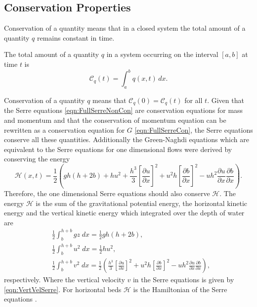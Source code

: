 \subsection{Conservation Properties}
Conservation of a quantity means that in a closed system the total amount of a quantity $q$ remains constant in time.
\begin{defn}
	\label{defn:TotalAmmountab}
	The total amount of a quantity $q$ in a system occurring on the interval $[a,b]$ at time $t$ is
	\begin{equation*}
	\mathcal{C}_q(t) = \int_{a}^{b} q(x,t)\, dx.
	\end{equation*}
\end{defn}
Conservation of a quantity $q$ means that $\mathcal{C}_{q}(0) = \mathcal{C}_{q}(t)$ for all $t$. Given that the Serre equations \eqref{eqn:FullSerreNonCon} are conservation equations for mass and momentum and that the conservation of momentum equation can be rewritten as a conservation equation for $G$ \eqref{eqn:FullSerreCon}, the Serre equations conserve all these quantities. Additionally the Green-Naghdi equations \cite{Green-Naghdi-1976-237} which are equivalent to the Serre equations for one dimensional flows were derived by conserving the energy
\begin{equation}
	\mathcal{H}(x,t) = \frac{1}{2} \left( gh\left(h + 2b\right) + hu^2  + \frac{h^3}{3} \left[\frac{\partial u}{\partial x}\right]^2 + u^2h\left[\frac{\partial b}{\partial x}\right]^2 - uh^2 \frac{\partial u}{\partial x} \frac{\partial b}{\partial x}  \right).
	\label{eqn:Hamildef}
\end{equation}
Therefore, the one dimensional Serre equations should also conserve $\mathcal{H}$. The energy $\mathcal{H}$ is the sum of the gravitational potential energy, the horizontal kinetic energy and the vertical kinetic energy which integrated over the depth of water are
\begin{align*}
& \frac{1}{2}\int_{b}^{h +b} gz \; dx = \frac{1}{2}gh\left(h + 2b\right), \\
& \frac{1}{2}\int_{b}^{h +b} u^2 \; dx = \frac{1}{2}hu^2, \\
& \frac{1}{2}\int_{b}^{h +b} v^2 \; dx = \frac{1}{2} \left(\frac{h^3}{3} \left[\frac{\partial u}{\partial x}\right]^2 + u^2h\left[\frac{\partial b}{\partial x}\right]^2 - uh^2 \frac{\partial u}{\partial x} \frac{\partial b}{\partial x} \right),
\end{align*}
respectively. Where the vertical velocity $v$ in the Serre equations is given by \eqref{eqn:VertVelSerre}. For horizontal beds $\mathcal{H}$ is the Hamiltonian of the Serre equations \cite{Li-Y-2002}.
 
